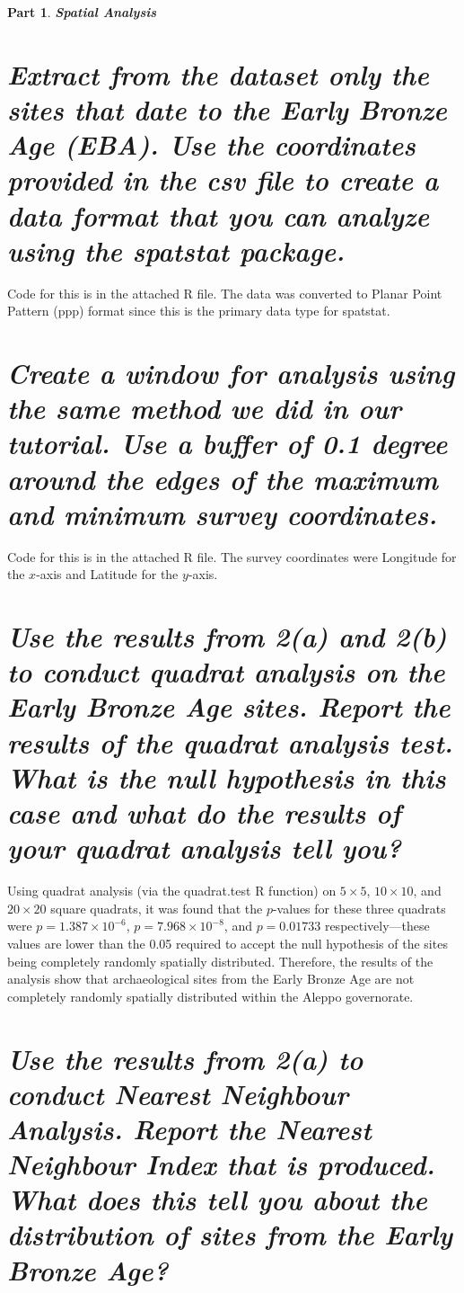 \documentclass[answers]{exam}
\newtheorem{problem}{Part}
\begin{document}
\color{black}
\begin{problem}
\textbf{Spatial Analysis}
\end{problem}
\begin{parts}
    \part{\textit{Extract from the dataset only the sites that date to the Early Bronze Age (EBA). Use the coordinates provided in the csv file to create a data format that you can analyze using the spatstat package.}}

    \color{nr}\quad\quad Code for this is in the attached R file. The data was converted to Planar Point Pattern (ppp) format since this is the primary data type for spatstat.

    \color{black}\part{\textit{Create a window for analysis using the same method we did in our tutorial. Use a buffer of 0.1 degree around the edges of the maximum and minimum survey coordinates.}}

\color{nr}\quad\quad Code for this is in the attached R file. The survey coordinates were Longitude for the $x$-axis and Latitude for the $y$-axis.

\color{black}\part{\textit{Use the results from 2(a) and 2(b) to conduct quadrat analysis on the Early Bronze Age sites. Report the results of the quadrat analysis test. What is the null hypothesis in this case and what do the results of your quadrat analysis tell you?}}

\quad\quad\color{nr} Using quadrat analysis (via the quadrat.test R function) on $5\times5$, $10\times10$, and $20\times20$ square quadrats, it was found that the $p$-values for these three quadrats were $p = 1.387\times10^{-6}$, $p = 7.968\times10^{-8}$, and $p = 0.01733$ respectively---these values are lower than the 0.05 required to accept the null hypothesis of the sites being completely randomly spatially distributed. Therefore, the results of the analysis show that archaeological sites from the Early Bronze Age are not completely randomly spatially distributed within the Aleppo governorate.

\color{black}\part{\textit{Use the results from 2(a) to conduct Nearest Neighbour Analysis. Report the Nearest Neighbour Index that is produced. What does this tell you about the distribution of sites from the Early Bronze Age?}}


\end{parts}
\end{document}
